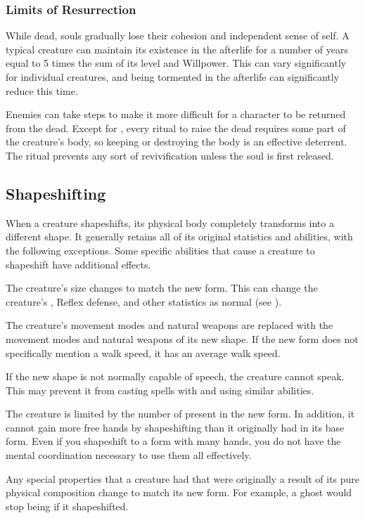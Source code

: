     \subsubsection{Limits of Resurrection}
      While dead, souls gradually lose their cohesion and independent sense of self.
      A typical creature can maintain its existence in the afterlife for a number of years equal to 5 times the sum of its level and Willpower.
      This can vary significantly for individual creatures, and being tormented in the afterlife can significantly reduce this time.

      Enemies can take steps to make it more difficult for a character to be returned from the dead.
      Except for , every ritual to raise the dead requires some part of the creature's body, so keeping or destroying the body is an effective deterrent.
      The  ritual prevents any sort of revivification unless the soul is first released.

  \subsection{Shapeshifting}\label{Shapeshifting}
    When a creature shapeshifts, its physical body completely transforms into a different shape.
    It generally retains all of its original statistics and abilities, with the following exceptions.
    Some specific abilities that cause a creature to shapeshift have additional effects.
    \begin{raggeditemize}
      \item The creature's size changes to match the new form.
        This can change the creature's , Reflex defense, and other statistics as normal (see ).
      \item The creature's  movement modes and natural weapons are replaced with the movement modes and natural weapons of its new shape.
        If the new form does not specifically mention a walk speed, it has an average walk speed.
      \item If the new shape is not normally capable of speech, the creature cannot speak.
        This may prevent it from casting spells with  and using similar abilities.
      \item The creature is limited by the number of  present in the new form.
        In addition, it cannot gain more free hands by shapeshifting than it originally had in its base form.
        Even if you shapeshift to a form with many hands, you do not have the mental coordination necessary to use them all effectively.
      \item Any special properties that a creature had that were originally a result of its pure physical composition change to match its new form.
        For example, a ghost would stop being  if it shapeshifted.
    \end{raggeditemize}

